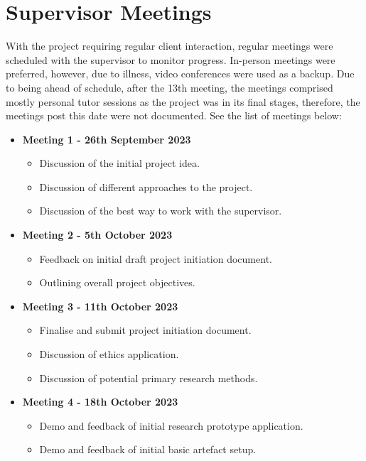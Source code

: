 \section{Supervisor Meetings}
\label{pm:supervisor_meetings}

With the project requiring regular client interaction, regular meetings were scheduled with the supervisor to monitor progress. In-person meetings were preferred, however, due to illness, video conferences were used as a backup. Due to being ahead of schedule, after the 13th meeting, the meetings comprised mostly personal tutor sessions as the project was in its final stages, therefore, the meetings post this date were not documented. See the list of meetings below:

\begin{itemize}
    \item \textbf{Meeting 1 - 26th September 2023}
    \begin{itemize}
        \item Discussion of the initial project idea.
        \item Discussion of different approaches to the project.
        \item Discussion of the best way to work with the supervisor.
    \end{itemize}
    \item \textbf{Meeting 2 - 5th October 2023}
    \begin{itemize}
        \item Feedback on initial draft project initiation document.
        \item Outlining overall project objectives.
    \end{itemize}
    \item \textbf{Meeting 3 - 11th October 2023}
    \begin{itemize}
        \item Finalise and submit project initiation document.
        \item Discussion of ethics application.
        \item Discussion of potential primary research methods.
    \end{itemize}
    \item \textbf{Meeting 4 - 18th October 2023}
    \begin{itemize}
        \item Demo and feedback of initial research prototype application.
        \item Demo and feedback of initial basic artefact setup.

\end{itemize}
\end{itemize}
